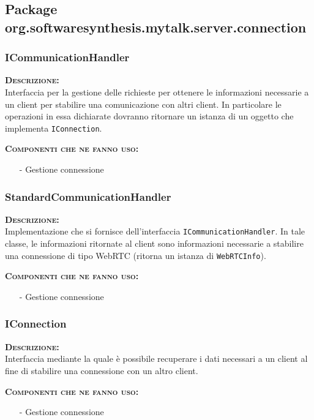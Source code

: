 \subsection{Package org.softwaresynthesis.mytalk.server.connection}

\subsubsection{ICommunicationHandler}
\begin{description}
	\item{\scshape\bfseries Descrizione:}\\
Interfaccia per la gestione delle richieste per ottenere le informazioni necessarie a un client per stabilire una comunicazione con altri client. In particolare le operazioni in essa dichiarate dovranno ritornare un istanza di un oggetto che implementa \texttt{IConnection}.
	\item{\scshape\bfseries Componenti che ne fanno uso:}
		\begin{itemize}[noitemsep,nolistsep]
			\item[-] Gestione connessione
		\end{itemize}
\end{description}

\subsubsection{StandardCommunicationHandler}
\begin{description}
	\item{\scshape\bfseries Descrizione:}\\
Implementazione che si fornisce dell'interfaccia \texttt{ICommunicationHandler}. In tale classe, le informazioni ritornate al client sono informazioni necessarie a stabilire una connessione di tipo WebRTC (ritorna un istanza di \texttt{WebRTCInfo}).
	\item{\scshape\bfseries Componenti che ne fanno uso:}
		\begin{itemize}[noitemsep,nolistsep]
			\item[-] Gestione connessione
		\end{itemize}
\end{description}

\subsubsection{IConnection}
\begin{description}
	\item{\scshape\bfseries Descrizione:}\\
Interfaccia mediante la quale è possibile recuperare  i dati necessari a un client al fine di stabilire una connessione con un altro client.
	\item{\scshape\bfseries Componenti che ne fanno uso:}
		\begin{itemize}[noitemsep,nolistsep]
			\item[-] Gestione connessione
		\end{itemize}
\end{description}


